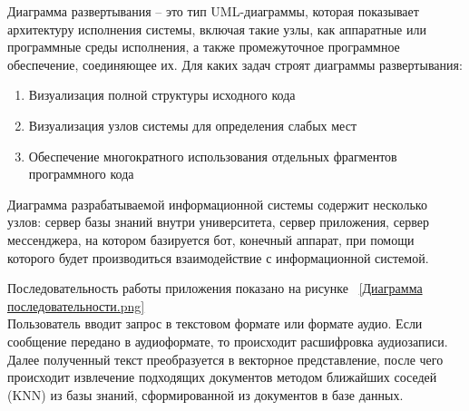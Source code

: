 
Диаграмма развертывания – это тип UML-диаграммы, которая показывает архитектуру
исполнения системы, включая такие узлы, как аппаратные или программные среды
исполнения, а также промежуточное программное обеспечение, соединяющее их. 
Для каких задач строят диаграммы развертывания:

\begin{enumerate}
    \item Визуализация полной структуры исходного кода
    \item Визуализация узлов системы для определения слабых мест
    \item Обеспечение многократного использования отдельных фрагментов
        программного кода
\end{enumerate}

Диаграмма разрабатываемой информационной системы содержит несколько узлов: 
сервер базы знаний внутри университета, сервер приложения, сервер мессенджера,
на котором базируется бот, конечный аппарат, при помощи которого будет 
производиться взаимодействие с информационной системой.



%
%
%
%

Последовательность работы приложения показано на рисунке
~\ref{Диаграмма последовательности.png}
\\
Пользователь вводит запрос в текстовом формате или формате аудио. Если
сообщение передано в аудиоформате, то происходит расшифровка аудиозаписи.
Далее полученный текст преобразуется в векторное представление, после чего
происходит извлечение подходящих документов методом ближайших соседей (KNN)
из базы знаний, сформированной из документов в базе данных.

